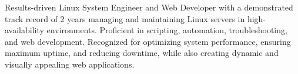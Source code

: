 \begin{cvparagraph}

Results-driven Linux System Engineer and Web Developer with a demonstrated track record of 2 years managing and maintaining Linux servers in high-availability environments. Proficient in scripting, automation, troubleshooting, and web development. Recognized for optimizing system performance, ensuring maximum uptime, and reducing downtime, while also creating dynamic and visually appealing web applications.
\end{cvparagraph}
